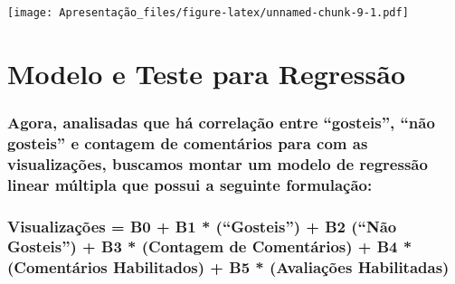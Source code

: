 \documentclass[]{article}
\newenvironment{Shaded}{\begin{snugshade}}{\end{snugshade}}
\newcommand{\DataTypeTok}[1]{\textcolor[rgb]{0.13,0.29,0.53}{#1}}
\newcommand{\DecValTok}[1]{\textcolor[rgb]{0.00,0.00,0.81}{#1}}
\newcommand{\ErrorTok}[1]{\textcolor[rgb]{0.64,0.00,0.00}{\textbf{#1}}}
\newcommand{\KeywordTok}[1]{\textcolor[rgb]{0.13,0.29,0.53}{\textbf{#1}}}
\newcommand{\NormalTok}[1]{#1}
\newcommand{\OperatorTok}[1]{\textcolor[rgb]{0.81,0.36,0.00}{\textbf{#1}}}
\newcommand{\StringTok}[1]{\textcolor[rgb]{0.31,0.60,0.02}{#1}}
\begin{document}
\begin{Shaded}
\end{Shaded}

\texttt{[image: Apresentação\_files/figure-latex/unnamed-chunk-9-1.pdf]}

\hypertarget{modelo-e-teste-para-regressao}{%
\section{Modelo e Teste para
Regressão}\label{modelo-e-teste-para-regressao}}

\hypertarget{agora-analisadas-que-ha-correlacao-entre-gosteis-nao-gosteis-e-contagem-de-comentarios-para-com-as-visualizacoes-buscamos-montar-um-modelo-de-regressao-linear-multipla-que-possui-a-seguinte-formulacao}{%
\subsubsection{Agora, analisadas que há correlação entre ``gosteis'',
``não gosteis'' e contagem de comentários para com as visualizações,
buscamos montar um modelo de regressão linear múltipla que possui a
seguinte
formulação:}\label{agora-analisadas-que-ha-correlacao-entre-gosteis-nao-gosteis-e-contagem-de-comentarios-para-com-as-visualizacoes-buscamos-montar-um-modelo-de-regressao-linear-multipla-que-possui-a-seguinte-formulacao}}

\hypertarget{visualizacoes-b0-b1-gosteis-b2-nao-gosteis-b3-contagem-de-comentarios-b4-comentarios-habilitados-b5-avaliacoes-habilitadas}{%
\subsubsection{Visualizações = B0 + B1 * (``Gosteis'') + B2 (``Não
Gosteis'') + B3 * (Contagem de Comentários) + B4 * (Comentários
Habilitados) + B5 * (Avaliações
Habilitadas)}\label{visualizacoes-b0-b1-gosteis-b2-nao-gosteis-b3-contagem-de-comentarios-b4-comentarios-habilitados-b5-avaliacoes-habilitadas}}
\end{document}
